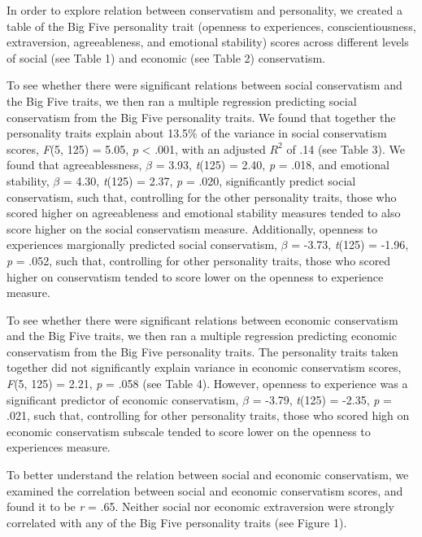 \documentclass[man]{apa6}
\begin{document}
In order to explore relation between conservatism and personality, we created a table of the Big Five personality trait (openness to experiences, conscientiousness, extraversion, agreeableness, and emotional stability) scores across different levels of social (see Table 1) and economic (see Table 2) conservatism.

To see whether there were significant relations between social conservatism and the Big Five traits, we then ran a multiple regression predicting social conservatism from the Big Five personality traits. We found that together the personality traits explain about 13.5\% of the variance in social conservatism scores, \emph{F}(5, 125) = 5.05, \emph{p} \textless{} .001, with an adjusted \(R^2\) of .14 (see Table 3). We found that agreeablessness, \(\beta\) = 3.93, \emph{t}(125) = 2.40, \emph{p} = .018, and emotional stability, \(\beta\) = 4.30, \emph{t}(125) = 2.37, \emph{p} = .020, significantly predict social conservatism, such that, controlling for the other personality traits, those who scored higher on agreeableness and emotional stability measures tended to also score higher on the social conservatism measure. Additionally, openness to experiences margionally predicted social conservatism, \(\beta\) = -3.73, \emph{t}(125) = -1.96, \emph{p} = .052, such that, controlling for other personality traits, those who scored higher on conservatism tended to score lower on the openness to experience measure.

To see whether there were significant relations between economic conservatism and the Big Five traits, we then ran a multiple regression predicting economic conservatism from the Big Five personality traits. The personality traits taken together did not significantly explain variance in economic conservatism scores, \emph{F}(5, 125) = 2.21, \emph{p} = .058 (see Table 4). However, openness to experience was a significant predictor of economic conservatism, \(\beta\) = -3.79, \emph{t}(125) = -2.35, \emph{p} = .021, such that, controlling for other personality traits, those who scored high on economic conservatism subscale tended to score lower on the openness to experiences measure.

To better understand the relation between social and economic conservatism, we examined the correlation between social and economic conservatism scores, and found it to be \emph{r} = .65. Neither social nor economic extraversion were strongly correlated with any of the Big Five personality traits (see Figure 1).
\end{document}
